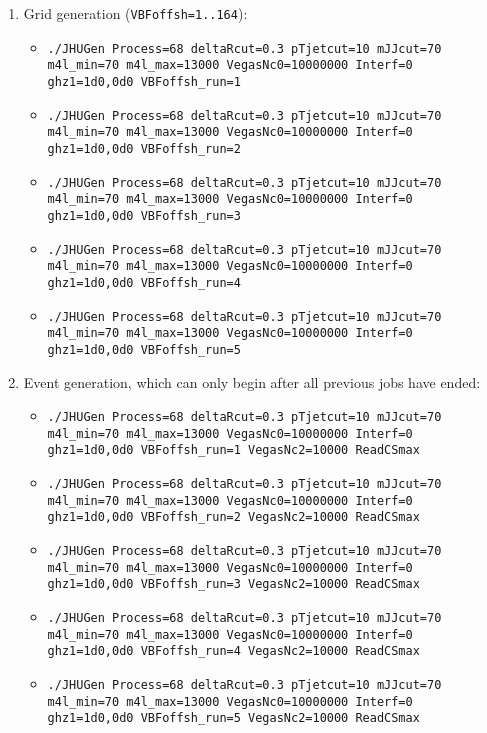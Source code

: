 \documentclass[aps,superscriptaddress,nofootinbib]{revtex4}
\begin{document}
\begin{enumerate}
	\item Grid generation (\verb|VBFoffsh=1..164|):
	\begin{itemize}
		\item \texttt{./JHUGen Process=68 deltaRcut=0.3 pTjetcut=10 mJJcut=70 m4l\_min=70 m4l\_max=13000 VegasNc0=10000000 Interf=0 ghz1=1d0,0d0 VBFoffsh\_run=1}
		\item \texttt{./JHUGen Process=68 deltaRcut=0.3 pTjetcut=10 mJJcut=70 m4l\_min=70 m4l\_max=13000 VegasNc0=10000000 Interf=0 ghz1=1d0,0d0 VBFoffsh\_run=2}
		\item \texttt{./JHUGen Process=68 deltaRcut=0.3 pTjetcut=10 mJJcut=70 m4l\_min=70 m4l\_max=13000 VegasNc0=10000000 Interf=0 ghz1=1d0,0d0 VBFoffsh\_run=3}
		\item \texttt{./JHUGen Process=68 deltaRcut=0.3 pTjetcut=10 mJJcut=70 m4l\_min=70 m4l\_max=13000 VegasNc0=10000000 Interf=0 ghz1=1d0,0d0 VBFoffsh\_run=4}
		\item \texttt{./JHUGen Process=68 deltaRcut=0.3 pTjetcut=10 mJJcut=70 m4l\_min=70 m4l\_max=13000 VegasNc0=10000000 Interf=0 ghz1=1d0,0d0 VBFoffsh\_run=5}
	\end{itemize}
	\item Event generation, which can only begin after all previous jobs have ended:
	\begin{itemize}
		\item \texttt{./JHUGen Process=68 deltaRcut=0.3 pTjetcut=10 mJJcut=70 m4l\_min=70 m4l\_max=13000 VegasNc0=10000000 Interf=0 ghz1=1d0,0d0 VBFoffsh\_run=1 VegasNc2=10000 ReadCSmax}
		\item \texttt{./JHUGen Process=68 deltaRcut=0.3 pTjetcut=10 mJJcut=70 m4l\_min=70 m4l\_max=13000 VegasNc0=10000000 Interf=0 ghz1=1d0,0d0 VBFoffsh\_run=2 VegasNc2=10000 ReadCSmax}
		\item \texttt{./JHUGen Process=68 deltaRcut=0.3 pTjetcut=10 mJJcut=70 m4l\_min=70 m4l\_max=13000 VegasNc0=10000000 Interf=0 ghz1=1d0,0d0 VBFoffsh\_run=3 VegasNc2=10000 ReadCSmax}
		\item \texttt{./JHUGen Process=68 deltaRcut=0.3 pTjetcut=10 mJJcut=70 m4l\_min=70 m4l\_max=13000 VegasNc0=10000000 Interf=0 ghz1=1d0,0d0 VBFoffsh\_run=4 VegasNc2=10000 ReadCSmax}
		\item \texttt{./JHUGen Process=68 deltaRcut=0.3 pTjetcut=10 mJJcut=70 m4l\_min=70 m4l\_max=13000 VegasNc0=10000000 Interf=0 ghz1=1d0,0d0 VBFoffsh\_run=5 VegasNc2=10000 ReadCSmax}
	\end{itemize}
\end{enumerate}
\end{document}
